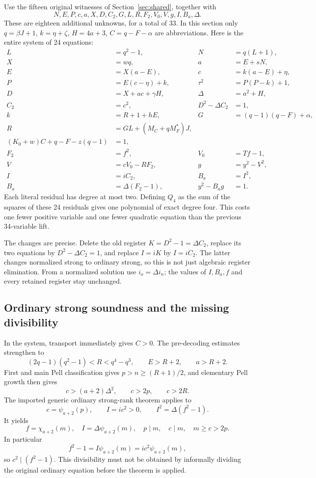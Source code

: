\documentclass[11pt]{article}
\begin{document}
Use the fifteen original witnesses of Section~\ref{sec:shared}, together with
\[
N,E,P,c,a,X,D,C_2,G,L,R,F_2,V_0,V,g,I,B_a,\Delta.
\]
These are eighteen additional unknowns, for a total of 33. In this section only
$q=\beta J+1$, $k=\eta+\zeta$, $H=4a+3$, $C=q-F-\alpha$ are abbreviations.
Here is the entire system of 24 equations:
\begin{align}
L&=q^2-1,& N&=q(L+1),\label{eq:q33start}\\
X&=wq,&a&=E+sN,\\
E&=X(a-E),&c&=k(a-E)+\eta,\\
P&=E(c-\eta)+k,&\tau^2&=P(P-k)+1,\\
D&=X+ac+\gamma H,&\Delta&=a^2+H,\\
C_2&=c^2,&D^2-\Delta C_2&=1,\\
k&=R+1+hE,&G&=(q-1)(q-F)+\alpha,\\
R&=GL+(M_C+qM_F^*)J,\\
(K_0+w)C+q-F-z(q-1)&=1,\\
F_2&=f^2,&V_0&=Tf-1,\\
V&=cV_0-RF_2,&g&=y^2-V^2,\\
I&=iC_2,&B_a&=I^2,\\
B_a&=\Delta(F_2-1),&y^2-B_ag&=1.\label{eq:q33end}
\end{align}
Each literal residual has degree at most two. Defining $Q_4$ as the sum of the squares of these 24 residuals gives one polynomial of exact degree four. This costs one fewer positive variable and one fewer quadratic equation than the previous 34-variable lift.

The changes are precise. Delete the old register $K=D^2-1=\Delta C_2$, replace its two equations by $D^2-\Delta C_2=1$, and replace $I=iK$ by $I=iC_2$. The latter changes normalized strong to ordinary strong, so this is not just algebraic register elimination. From a normalized solution use $i_o=\Delta i_n$; the values of $I,B_a,f$ and every retained register stay unchanged.

\subsection{Ordinary strong soundness and the missing divisibility}

In the system, transport immediately gives $C>0$. The pre-decoding estimates strengthen to
\[
(2q-1)(q^2-1)<R<q^4-q^3,\qquad E>R+2,\qquad a>R+2.
\]
First and main Pell classification gives $p>n\geq(R+1)/2$, and elementary Pell growth then gives
\[
c>(a+2)\Delta^2,\qquad c>2p,\qquad c>2R.
\]
The imported generic ordinary strong-rank theorem applies to
\[
c=\psi_{a+2}(p),\qquad I=ic^2>0,\qquad I^2=\Delta(f^2-1).
\]
It yields
\[
f=\chi_{a+2}(m),\quad I=\Delta\psi_{a+2}(m),\quad
p\mid m,\quad c\mid m,\quad m\geq c>2p.
\]
In particular
\[
f^2-1=I\psi_{a+2}(m)=ic^2\psi_{a+2}(m),
\]
so $c^2\mid(f^2-1)$. This divisibility must not be obtained by informally dividing the original ordinary equation before the theorem is applied.
\end{document}
